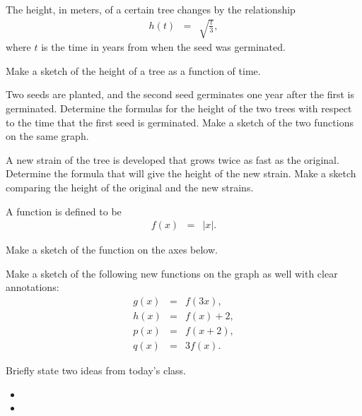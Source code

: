 \begin{problem}
\item The height, in meters, of a certain tree changes by the
  relationship
  \begin{eqnarray*}
    h(t) & = & \sqrt{\frac{t}{3}},
  \end{eqnarray*}
  where $t$ is the time in years from when the seed was germinated. 
  \begin{subproblem}
  \item Make a sketch of the height of a tree as a function of time.
    \vfill
  \item Two seeds are planted, and the second seed germinates one year
    after the first is germinated. Determine the formulas for the
    height of the two trees with respect to the time that the first
    seed is germinated. Make a sketch of the two functions on the same
    graph.
    \vfill
  \item A new strain of the tree is developed that grows twice as fast
    as the original. Determine the formula that will give the height
    of the new strain. Make a sketch comparing the height of the
    original and the new strains.
    \vfill
  \end{subproblem}

  \clearpage

\item A function is defined to be
  \begin{eqnarray*}
    f(x) & = & |x|.
  \end{eqnarray*}
  \begin{subproblem}
  \item Make a sketch of the function on the axes below.
  \item Make a sketch of the following new functions on the graph as
    well with clear annotations:
    \begin{eqnarray*}
      g(x) & = & f(3x), \\
      h(x) & = & f(x)+2, \\
      p(x) & = & f(x+2), \\
      q(x) & = & 3f(x).
    \end{eqnarray*}

    \hspace*{-6em}
    \scalebox{0.95}{}

  \end{subproblem}
\end{problem}

\postClass

\begin{problem}
\item Briefly state two ideas from today's class.
  \begin{itemize}
  \item 
  \item 
  \end{itemize}
\item 
  \begin{subproblem}
    \item
  \end{subproblem}
\end{problem}



